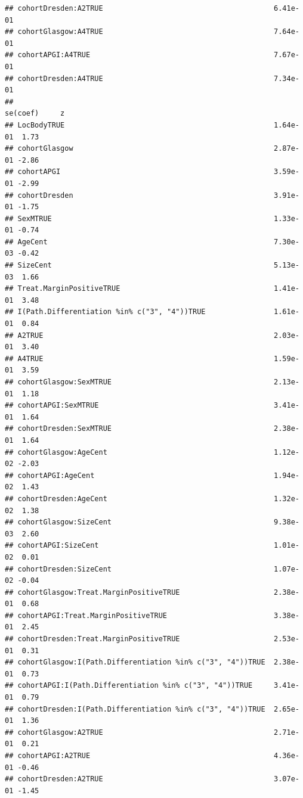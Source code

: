 \documentclass{article}\usepackage[]{graphicx}\usepackage[]{color}
\makeatletter
\newenvironment{kframe}{%
 \def\at@end@of@kframe{}%
 \ifinner\ifhmode%
  \def\at@end@of@kframe{\end{minipage}}%
  \begin{minipage}{\columnwidth}%
 \fi\fi%
 \def\FrameCommand##1{\hskip\@totalleftmargin \hskip-\fboxsep
 \colorbox{shadecolor}{##1}\hskip-\fboxsep
     \hskip-\linewidth \hskip-\@totalleftmargin \hskip\columnwidth}%
 \MakeFramed {\advance\hsize-\width
   \@totalleftmargin\z@ \linewidth\hsize
   \@setminipage}}%
 {\par\unskip\endMakeFramed%
 \at@end@of@kframe}
\newenvironment{knitrout}{}{} %
\makeatother
\begin{document}
\begin{knitrout}
\begin{kframe}
\begin{verbatim}
## cohortDresden:A2TRUE                                        6.41e-01
## cohortGlasgow:A4TRUE                                        7.64e-01
## cohortAPGI:A4TRUE                                           7.67e-01
## cohortDresden:A4TRUE                                        7.34e-01
##                                                             se(coef)     z
## LocBodyTRUE                                                 1.64e-01  1.73
## cohortGlasgow                                               2.87e-01 -2.86
## cohortAPGI                                                  3.59e-01 -2.99
## cohortDresden                                               3.91e-01 -1.75
## SexMTRUE                                                    1.33e-01 -0.74
## AgeCent                                                     7.30e-03 -0.42
## SizeCent                                                    5.13e-03  1.66
## Treat.MarginPositiveTRUE                                    1.41e-01  3.48
## I(Path.Differentiation %in% c("3", "4"))TRUE                1.61e-01  0.84
## A2TRUE                                                      2.03e-01  3.40
## A4TRUE                                                      1.59e-01  3.59
## cohortGlasgow:SexMTRUE                                      2.13e-01  1.18
## cohortAPGI:SexMTRUE                                         3.41e-01  1.64
## cohortDresden:SexMTRUE                                      2.38e-01  1.64
## cohortGlasgow:AgeCent                                       1.12e-02 -2.03
## cohortAPGI:AgeCent                                          1.94e-02  1.43
## cohortDresden:AgeCent                                       1.32e-02  1.38
## cohortGlasgow:SizeCent                                      9.38e-03  2.60
## cohortAPGI:SizeCent                                         1.01e-02  0.01
## cohortDresden:SizeCent                                      1.07e-02 -0.04
## cohortGlasgow:Treat.MarginPositiveTRUE                      2.38e-01  0.68
## cohortAPGI:Treat.MarginPositiveTRUE                         3.38e-01  2.45
## cohortDresden:Treat.MarginPositiveTRUE                      2.53e-01  0.31
## cohortGlasgow:I(Path.Differentiation %in% c("3", "4"))TRUE  2.38e-01  0.73
## cohortAPGI:I(Path.Differentiation %in% c("3", "4"))TRUE     3.41e-01  0.79
## cohortDresden:I(Path.Differentiation %in% c("3", "4"))TRUE  2.65e-01  1.36
## cohortGlasgow:A2TRUE                                        2.71e-01  0.21
## cohortAPGI:A2TRUE                                           4.36e-01 -0.46
## cohortDresden:A2TRUE                                        3.07e-01 -1.45

\end{verbatim}
\end{kframe}
\end{knitrout}
\end{document}
